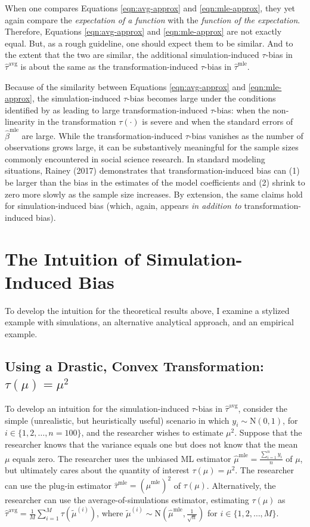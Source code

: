 \documentclass[12pt]{article}
\begin{document}
When one compares Equations \ref{eqn:avg-approx} and \ref{eqn:mle-approx}, they yet again compare the \textit{expectation of a function} with the \textit{function of the expectation}.
Therefore, Equations \ref{eqn:avg-approx} and \ref{eqn:mle-approx} are not exactly equal.
But, as a rough guideline, one should expect them to be similar.
And to the extent that the two are similar, the additional simulation-induced $\tau$-bias in $\hat{\tau}^\text{avg}$ is about the same as the transformation-induced $\tau$-bias in $\hat{\tau}^\text{mle}$. 

Because of the similarity between Equations \ref{eqn:avg-approx} and \ref{eqn:mle-approx}, the simulation-induced $\tau$-bias becomes large under the conditions identified by \cite{Rainey2017} as leading to large transformation-induced $\tau$-bias: when the non-linearity in the transformation $\tau(\cdot)$ is severe and when the standard errors of $\hat{\beta}^\text{mle}$ are large.
While the transformation-induced $\tau$-bias vanishes as the number of observations grows large, it can be substantively meaningful for the sample sizes commonly encountered in social science research. 
In standard modeling situations, Rainey (2017) demonstrates that transformation-induced bias can (1) be larger than the bias in the estimates of the model coefficients and (2) shrink to zero more slowly as the sample size increases. 
By extension, the same claims hold for simulation-induced bias (which, again, appears \textit{in addition to} transformation-induced bias). 

\section*{The Intuition of Simulation-Induced Bias}

To develop the intuition for the theoretical results above, I examine a stylized example with simulations, an alternative analytical approach, and an empirical example.

\subsection*{Using a Drastic, Convex Transformation: $\tau(\mu) = \mu^2$}

To develop an intuition for the simulation-induced $\tau$-bias in $\hat{\tau}^\text{avg}$, consider the simple (unrealistic, but heuristically useful) scenario in which $y_i \sim \text{N}(0, 1)$, for $i \in \{1, 2, \ldots, n = 100\}$, and the researcher wishes to estimate $\mu^2$. Suppose that the researcher knows that the variance equals one but does not know that the mean $\mu$ equals zero. The researcher uses the unbiased ML estimator $\hat{\mu}^\text{mle} = \frac{\sum_{i=1}^n y_i}{n}$ of $\mu$, but ultimately cares about the quantity of interest $\tau(\mu) = \mu^2$. The researcher can use the plug-in estimator $\hat{\tau}^\text{mle} = \left( \hat{\mu}^\text{mle} \right) ^2$ of $\tau(\mu)$. Alternatively, the researcher can use the average-of-simulations estimator, estimating $\tau(\mu)$ as $\hat{\tau}^\text{avg} = \frac{1}{M} \sum_{i = 1}^M \tau \left( \tilde{\mu}^{(i)} \right)$, where $\tilde{\mu}^{(i)} \sim \text{N} \left( \hat{\mu}^\text{mle}, \frac{1}{\sqrt{n}} \right)$ for $i \in \{1, 2,\ldots, M\}$.
\end{document}
